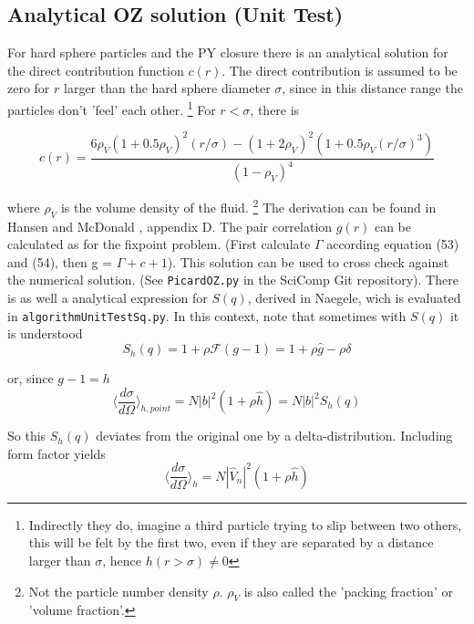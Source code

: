 \documentclass[11pt,a4paper]{article}
\begin{document}
\subsection{Analytical OZ solution (Unit Test)}
For hard sphere particles and the PY closure there is an analytical solution for the direct contribution function
$c(r)$. The direct contribution is assumed to be zero for $r$ larger than the hard sphere diameter
$\sigma$, since in this distance range the particles don't 'feel' each other. 
\footnote{Indirectly they do, imagine a third particle trying to slip between two others, this will be felt by the
first two, even if they are separated by a distance larger than $ \sigma$, hence $h(r > \sigma) \ne 0$}
For $r < \sigma$, there is

\begin{equation}
c(r) =
\frac{
6 \rho_V (1 + 0.5\rho_V)^2 (r/\sigma) - (1 + 2\rho_V)^2 (1 + 0.5\rho_V(r/\sigma)^3) 
}
{ (1 - \rho_V)^4 }
\end{equation}

where $\rho_V$ is the volume density of the fluid. \footnote{Not the particle number density $\rho$. $\rho_V$ is also called the 'packing fraction' or
'volume fraction'.}
The derivation can be found in Hansen and McDonald \cite{hansen2006theory}, appendix D. The pair correlation $g(r)$ can be calculated as for the fixpoint
problem. (First calculate $\Gamma$ according equation (53) and (54), then g = $\Gamma + c +1$). \newline
This solution can be used to cross check against the numerical solution. (See \texttt{PicardOZ.py} in the SciComp Git repository).
\newline
There is as well a analytical expression for $S(q)$, derived in Naegele, wich is evaluated in  \texttt{algorithmUnitTestSq.py}.
\newline
In this context, note that sometimes with $S(q)$ it is understood
\begin{equation}
S_h(q) = 1 + \rho \mathcal{F}(g -1) =
1 + \rho \hat g -  \rho \delta
\end{equation}

or, since $g -1 = h$
\begin{equation}
\langle \frac {d \sigma}{d \Omega} \rangle_{h,point} = N |b|^2 (1 + \rho \hat h )
= N |b|^2 S_h(q)
\end{equation}

So this $S_h(q)$ deviates from the original one by a delta-distribution. Including form factor yields
\begin{equation}
\langle \frac {d \sigma}{d \Omega} \rangle_h  = N |\hat V_n|^2 (1 + \rho \hat h )
\end{equation}
\end{document}
